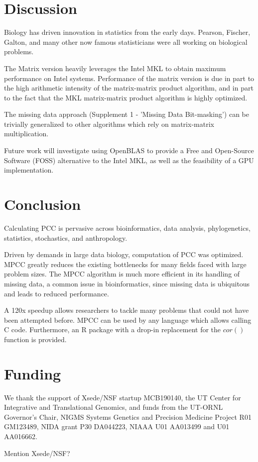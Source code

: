 \documentclass{bioinfo}
\begin{document}
\vspace*{-5mm}
\section{Discussion}

Biology has driven innovation in statistics from the early
days. Pearson, Fischer, Galton, and many other now famous
statisticians were all working on biological problems.

The Matrix version heavily leverages the Intel\textregistered{} MKL to
obtain maximum performance on Intel\textregistered{}
systems. Performance of the matrix version is due in part to the high
arithmetic intensity of the matrix-matrix product algorithm, and in
part to the fact that the MKL matrix-matrix product algorithm is
highly optimized.

The missing data approach (Supplement 1 - 'Missing Data Bit-masking')
can be trivially generalized to other algorithms which rely on
matrix-matrix multiplication.

Future work will investigate using OpenBLAS to provide a Free and
Open-Source Software (FOSS) alternative to the Intel\textregistered{}
MKL, as well as the feasibility of a GPU implementation.
\vspace*{-5mm}

\section{Conclusion}

Calculating PCC is pervasive across bioinformatics, data
analysis, phylogenetics, statistics, stochastics, and anthropology.

Driven by demands in large data biology, computation of PCC was
optimized.  MPCC greatly reduces the existing bottlenecks for many
fields faced with large problem sizes. The MPCC algorithm is much more
efficient in its handling of missing data, a common issue in
bioinformatics, since missing data is ubiquitous and leads to reduced
performance.

A 120x speedup allows researchers to tackle many problems that could
not have been attempted before. MPCC can be used by any language which
allows calling C code. Furthermore, an R package with a drop-in
replacement for the $cor()$ function is provided.

\vspace*{-5mm}
\section*{Funding}

We thank the support of Xsede/NSF startup MCB190140, the UT Center for
Integrative and Translational Genomics, and funds from the UT-ORNL
Governor's Chair, NIGMS Systems Genetics and Precision Medicine
Project R01 GM123489, NIDA grant P30 DA044223, NIAAA U01 AA013499 and
U01 AA016662.

Mention Xsede/NSF?

\vspace*{-5mm}


\end{document}
